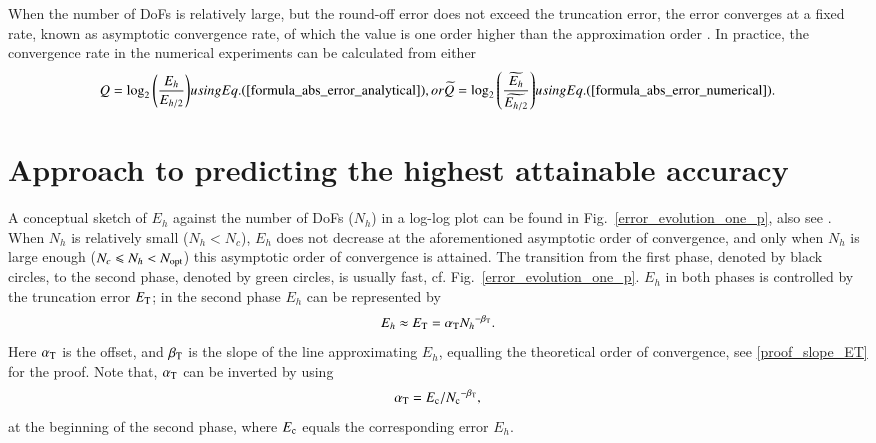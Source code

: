 \documentclass[review,3p]{elsarticle}
\begin{document}
When the number of DoFs is relatively large, but the round-off error does not exceed the truncation error, the error converges at a fixed rate, known as asymptotic convergence rate, of which the value is one order higher than the approximation order \cite{gockenbach2006understanding}. In practice, the convergence rate in the numerical experiments can be calculated from either 
\begin{subequations}	\label{formula_order_of_convergence_block}
\begin{align}
 Q=\log _2 \left( \frac{E_{h}}{E_{h/2}} \right)
 \label{formula_order_of_convergence_analytical_solution}
\end{align}
using Eq. (\ref{formula_abs_error_analytical}), or
\begin{align}
 \widetilde{Q}=\log _2 \left( \frac{\widetilde {E_{h}}}{\widetilde {E_{h/2}}} \right)		\label{formula_order_of_convergence_finer_solution}
\end{align}
using Eq. (\ref{formula_abs_error_numerical}).
\end{subequations}


\section{Approach to predicting the highest attainable accuracy}      \label{section_error_evolution_and_prediction}

A conceptual sketch of $E_h$ against the number of DoFs ($N_h$) in a log-log plot can be found in Fig.~\ref{error_evolution_one_p}, also see \cite{butcher2016numerical}.
When $N_h$ is relatively small ($N_h<N_c$), $E_h$ does not decrease at the aforementioned asymptotic order of convergence, and only when $N_h$ is large enough ($N_c \leqslant N_h < N_{\rm opt}$) this asymptotic order of convergence is attained.  The transition from the first phase, denoted by black circles, to the second phase, denoted by green circles, is usually fast, cf. Fig.~\ref{error_evolution_one_p}. $E_h$ in both phases is controlled by the truncation error $E_{\rm T}$; in the second phase $E_h$ can be represented by 
\begin{equation}
 E_{h} \approx E_{\rm T} = \alpha_{\rm T}{N_{h}}^{-\beta_{\rm T}}.		\label{formula_truncation_error}
\end{equation}
Here $\alpha_{\rm T}$ is the offset, and $\beta_{\rm T}$ is the slope of the line approximating $E_h$, equalling the theoretical order of convergence, see \ref{proof_slope_ET} for the proof. Note that, $\alpha_{\rm T}$ can be inverted by using 
\begin{equation}
 \alpha_{\rm T} = {E_{\rm c}}/{N_{\rm c}}^{- \beta_{\rm T}},		\label{formula_offset_truncation_error}
\end{equation}
at the beginning of the second phase, where $E_{\rm c}$ equals the corresponding error $E_h$.
\end{document}
